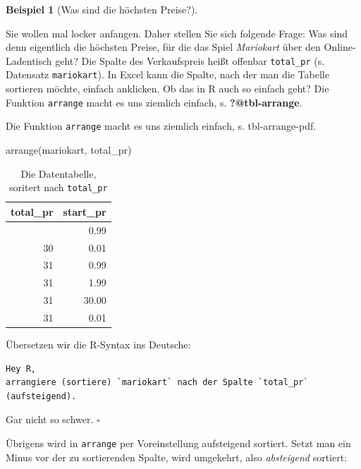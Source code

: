 \documentclass[
  letterpaper,
  oneside,
  open=any]{scrbook}
\newenvironment{Shaded}{\begin{snugshade}}{\end{snugshade}}
\newcommand{\FunctionTok}[1]{\textcolor[rgb]{0.28,0.35,0.67}{#1}}
\newcommand{\NormalTok}[1]{\textcolor[rgb]{0.00,0.23,0.31}{#1}}
\theoremstyle{definition}
\theoremstyle{definition}
\newtheorem{example}{Beispiel}[chapter]
\theoremstyle{definition}
\theoremstyle{remark}
\begin{document}
\begin{example}[Was sind die höchsten
Preise?]\protect\hypertarget{exm-arrange1}{}\label{exm-arrange1}

Sie wollen mal locker anfangen. Daher stellen Sie sich folgende Frage:
Was sind denn eigentlich die höchsten Preise, für die das Spiel
\emph{Mariokart} über den Online-Ladentisch geht? Die Spalte des
Verkaufspreis heißt offenbar \texttt{total\_pr} (s. Datensatz
\texttt{mariokart}). In Excel kann die Spalte, nach der man die Tabelle
sortieren möchte, einfach anklicken. Ob das in R auch so einfach geht?
Die Funktion \texttt{arrange} macht es uns ziemlich einfach, s.
\textbf{?@tbl-arrange}.

Die Funktion \texttt{arrange} macht es uns ziemlich einfach, s.
tbl-arrange-pdf.

\begin{Shaded}
\begin{Highlighting}[]
\FunctionTok{arrange}\NormalTok{(mariokart, total\_pr) }
\end{Highlighting}
\end{Shaded}

\begin{longtable}[]{@{}rr@{}}

\caption{\label{tbl-arrange-pdf}Die Datentabelle, soritert nach
\texttt{total\_pr}}

\tabularnewline

\toprule\noalign{}
total\_pr & start\_pr \\
\midrule\noalign{}
\endhead
\bottomrule\noalign{}
\endlastfoot
29 & 0.99 \\
30 & 0.01 \\
31 & 0.99 \\
31 & 1.99 \\
31 & 30.00 \\
31 & 0.01 \\

\end{longtable}

Übersetzen wir die R-Syntax ins Deutsche:

\begin{verbatim}
Hey R,
arrangiere (sortiere) `mariokart` nach der Spalte `total_pr` (aufsteigend).
\end{verbatim}

Gar nicht so schwer. \(\square\)

\end{example}

Übrigens wird in \texttt{arrange} per Voreinstellung aufsteigend
sortiert. Setzt man ein Minus vor der zu sortierenden Spalte, wird
umgekehrt, also \emph{absteigend} sortiert:
\end{document}
